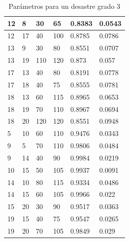 \documentclass[letter, 10pt]{article}
\begin{document}
\begin{table}[H]
\begin{tabular}{|l|l|l|l|l|l|}
12 & 8 & 30 & 65 & 0.8383 & 0.0543 \\ \hline
12 & 17 & 40 & 100 & 0.8785 & 0.0786 \\ \hline
13 & 9 & 30 & 80 & 0.8551 & 0.0707 \\ \hline
13 & 19 & 110 & 120 & 0.873 & 0.057 \\ \hline
17 & 13 & 40 & 80 & 0.8191 & 0.0778 \\ \hline
17 & 18 & 40 & 75 & 0.8555 & 0.0781 \\ \hline
18 & 13 & 60 & 115 & 0.8965 & 0.0653 \\ \hline
18 & 19 & 70 & 110 & 0.8967 & 0.0694 \\ \hline
18 & 20 & 120 & 120 & 0.8551 & 0.0948 \\ \hline
5 & 10 & 60 & 110 & 0.9476 & 0.0343 \\ \hline
9 & 5 & 70 & 110 & 0.9806 & 0.0484 \\ \hline
9 & 14 & 40 & 90 & 0.9984 & 0.0219 \\ \hline
10 & 15 & 50 & 105 & 0.9937 & 0.0091 \\ \hline
14 & 10 & 80 & 115 & 0.9334 & 0.0486 \\ \hline
14 & 15 & 60 & 105 & 0.9966 & 0.022 \\ \hline
15 & 20 & 30 & 90 & 0.9517 & 0.0363 \\ \hline
19 & 15 & 40 & 75 & 0.9547 & 0.0265 \\ \hline
19 & 20 & 70 & 105 & 0.9849 & 0.029 \\ \hline
\end{tabular}
\caption{Parámetros para un desastre grado 3}\label{grade3}
\end{table}
\end{document}
